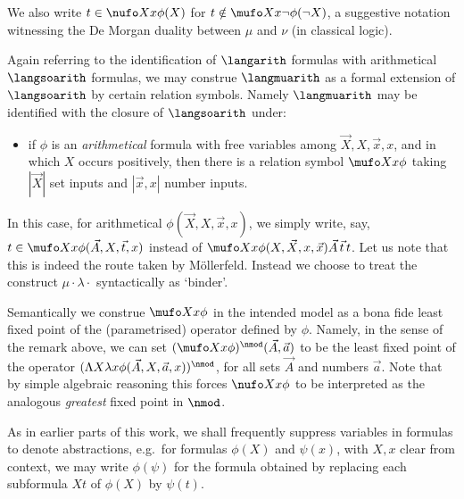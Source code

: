 We also write $t \in \nufo X x \phi(X)$ for $t \notin \mufo X x \lnot \phi(\lnot X)$, a suggestive notation witnessing the De Morgan duality between $\mu$ and $\nu$ (in classical logic).

\begin{remark}
\label{rem:langmuarith-extends-langsoarith}
Again referring to the identification of $\langarith$ formulas with arithmetical $\langsoarith$ formulas, we may construe $\langmuarith$ as a formal extension of $\langsoarith$ by certain relation symbols.
Namely
$\langmuarith$ may be identified with the closure of $\langsoarith$ under:
    \begin{itemize}
        \item if $\phi$ is an \emph{arithmetical} formula with free variables among $\vec X, X, \vec x, x$, and in which $X$ occurs positively, then there is a relation symbol $\mufo X x \phi$  taking $|\vec X|$ set inputs and $|\vec x,x|$ number inputs.
    \end{itemize}
In this case, for arithmetical $\phi(\vec X, X, \vec x, x)$, we simply write, say, $t \in \mufo X x {\phi(\vec A, X, \vec t, x)} $ instead of $\mufo X x {\phi(X,\vec X,x,\vec x)} \vec A \,  \vec t\, t$.
Let us note that this is indeed the route taken by M\"ollerfeld.
Instead we choose to treat the construct $\mu \cdot \lambda \cdot $ syntactically as `binder'.
\end{remark}

Semantically we construe $\mufo X x \phi$ in the intended model as a bona fide least fixed point of the (parametrised) operator defined by $\phi$. 
Namely, in the sense of the remark above, we can set $(\mufo X x \phi)^\nmod (\vec A,\vec a)$ to be the least fixed point of the operator $(\Lambda X \lambda x \phi(\vec A, X, \vec a, x))^\nmod$, for all sets $\vec A$ and numbers $\vec a$.
Note that by simple algebraic reasoning this forces $\nufo X x \phi$ to be interpreted as the analogous \emph{greatest} fixed point in $\nmod$.

As in earlier parts of this work, we shall frequently suppress variables in formulas to denote abstractions, e.g.\ for formulas $\phi(X)$ and $\psi(x)$, with $X,x$ clear from context, we may write $\phi(\psi)$ for the formula obtained by replacing each subformula $Xt$ of $\phi(X)$ by $\psi(t)$.

